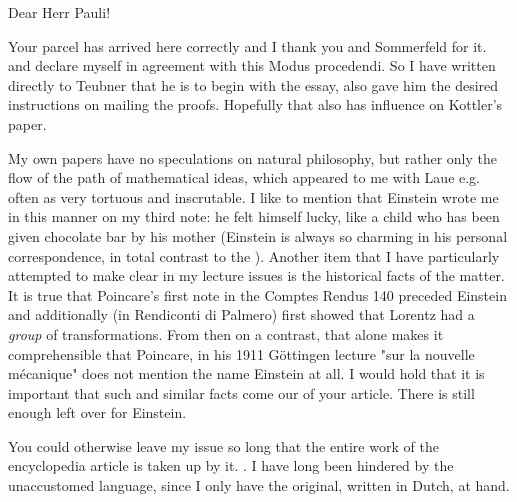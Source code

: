 \begin{letter}{10}
\begin{header}
\date{1921/03/08}

\makeheader

\end{header}

Dear Herr Pauli!

Your parcel has arrived here correctly and I thank you and Sommerfeld for it. and declare myself in agreement with this Modus procedendi. So I have written directly to Teubner that he is to begin with the essay, also gave him the desired instructions on mailing the proofs. Hopefully that also has  influence on Kottler's paper.

My own papers have no speculations on natural philosophy, but rather only the flow of the path of mathematical ideas, which appeared to me with Laue e.g. often as very tortuous and inscrutable. I like to mention that Einstein wrote me in this manner on my third note: he felt himself lucky, like a child who has been given chocolate bar by his mother (Einstein is always so charming in his personal correspondence, in total contrast to the ). Another item that I have particularly attempted to make clear in my lecture issues is the historical facts of the matter. It is true that Poincare's first note in the Comptes Rendus 140 preceded Einstein and additionally (in Rendiconti di Palmero) first showed that Lorentz had a \textit{group} of transformations. From then on a contrast, that alone makes it comprehensible that Poincare, in his 1911 G\"ottingen lecture "sur la nouvelle mécanique" does not mention the name Einstein at all. I would hold that it is important that such and similar facts come our of your article. There is still enough left over for Einstein.

You could otherwise leave my issue so long that the entire work of the encyclopedia article is taken up by it. . I have long been hindered by the unaccustomed language, since I only have the original, written in Dutch, at hand.


\end{letter}
